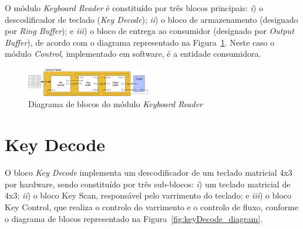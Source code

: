 \documentclass[10pt,a4paper,twocolumn]{article}
\begin{document}
\pagestyle{fancy}
\fancyhead{} %
\fancyfoot{} %
\fancyfoot[RO]{\thepage}


O módulo \textit{Keyboard Reader }é constituído por três blocos principais: \textit{i}) o descodificador de teclado (\textit{Key Decode}); \textit{ii}) o bloco de armazenamento (designado por \textit{Ring Buffer}); e \textit{iii}) o bloco de entrega ao consumidor (designado por \textit{Output Buffer}), de acordo com o diagrama representado na Figura~\ref{fig:keyboardReader}. 
Neste caso o módulo \textit{Control}, implementado em software, é a entidade consumidora.

\begin{figure}[!h]
\begin{center}
\includegraphics[width=0.48\textwidth]{keyboardReader_diagram.png} 
\caption{Diagrama de blocos do módulo \textit{Keyboard Reader}}
\label{fig:keyboardReader}
\end{center}
\end{figure} 

\section{Key Decode}
O bloco \textit{Key Decode} implementa um descodificador de um teclado matricial 4x3 por hardware, sendo constituído por três sub-blocos: \textit{i}) um teclado matricial de 4x3; \textit{ii}) o bloco Key Scan, responsável pelo varrimento do teclado; e \textit{iii}) o bloco Key Control, que realiza o controlo do varrimento e o controlo de fluxo, conforme o diagrama de blocos representado na Figura~\ref{fig:keyDecode_diagram}. 
\end{document}
